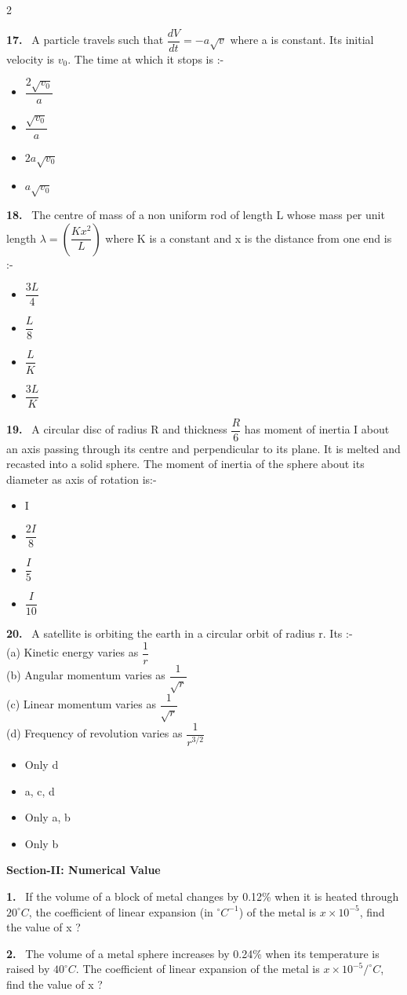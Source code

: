 \documentclass[10pt]{extarticle}
\newcommand{\sect}[1]{\par\smallskip\noindent\textbf{#1}\par}
\newcommand{\qn}[1]{\par\smallskip\noindent\textbf{#1.}~}
\newenvironment{qoptions}{\begin{itemize}[leftmargin=1.8em,itemsep=1pt,topsep=2pt,label={}]}{\end{itemize}}
\newcommand{\opt}[2]{\item[(#1)] #2}
\begin{document}
\begin{multicols}{2}
\qn{17} A particle travels such that $\dfrac{dV}{dt}=-a\sqrt v$ where a is constant. Its initial velocity is $v_0$. The time at which it stops is :-
\begin{qoptions}
\opt{A}{$\dfrac{2\sqrt{v_0}}{a}$}
\opt{B}{$\dfrac{\sqrt{v_0}}{a}$}
\opt{C}{$2a\sqrt{v_0}$}
\opt{D}{$a\sqrt{v_0}$}
\end{qoptions}

\qn{18} The centre of mass of a non uniform rod of length L whose mass per unit length $\lambda=\left(\dfrac{Kx^2}{L}\right)$ where K is a constant and x is the distance from one end is :-
\begin{qoptions}
\opt{A}{$\dfrac{3L}{4}$}
\opt{B}{$\dfrac{L}{8}$}
\opt{C}{$\dfrac{L}{K}$}
\opt{D}{$\dfrac{3L}{K}$}
\end{qoptions}

\qn{19} A circular disc of radius R and thickness $\dfrac R6$ has moment of inertia I about an axis passing through its centre and perpendicular to its plane. It is melted and recasted into a solid sphere. The moment of inertia of the sphere about its diameter as axis of rotation is:-
\begin{qoptions}
\opt{A}{I}
\opt{B}{$\dfrac{2I}{8}$}
\opt{C}{$\dfrac{I}{5}$}
\opt{D}{$\dfrac{I}{10}$}
\end{qoptions}

\qn{20} A satellite is orbiting the earth in a circular orbit of radius r. Its :-\\
(a) Kinetic energy varies as $\dfrac1r$\\
(b) Angular momentum varies as $\dfrac{1}{\sqrt r}$\\
(c) Linear momentum varies as $\dfrac{1}{\sqrt r}$\\
(d) Frequency of revolution varies as $\dfrac{1}{r^{3/2}}$
\begin{qoptions}
\opt{A}{Only d}
\opt{B}{a, c, d}
\opt{C}{Only a, b}
\opt{D}{Only b}
\end{qoptions}

\sect{Section-II: Numerical Value}

\qn{1} If the volume of a block of metal changes by 0.12\% when it is heated through $20^\circ C$, the coefficient of linear expansion (in $^\circ C^{-1}$) of the metal is $x\times10^{-5}$, find the value of x ?

\qn{2} The volume of a metal sphere increases by 0.24\% when its temperature is raised by $40^\circ C$. The coefficient of linear expansion of the metal is $x\times10^{-5}/^\circ C$, find the value of x ?


\end{multicols}
\end{document}
